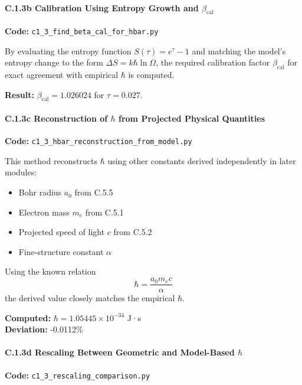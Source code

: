 \documentclass[10.5pt,a4paper]{article}
\begin{document}
\paragraph{C.1.3b Calibration Using Entropy Growth and \(\beta_{\text{cal}}\)}

\noindent\textbf{Code:} \texttt{c1\_3\_find\_beta\_cal\_for\_hbar.py}

By evaluating the entropy function \( S(\tau) = e^\tau - 1 \) and matching the model’s entropy change to the form \( \Delta S = k \hbar \ln \Omega \), the required calibration factor \( \beta_{\text{cal}} \) for exact agreement with empirical \( \hbar \) is computed.

\medskip

\noindent\textbf{Result:} \( \beta_{\text{cal}} = 1.026024 \) for \( \tau = 0.027 \).

\paragraph{C.1.3c Reconstruction of \(\hbar\) from Projected Physical Quantities}

\noindent\textbf{Code:} \texttt{c1\_3\_hbar\_reconstruction\_from\_model.py}

This method reconstructs \( \hbar \) using other constants derived independently in later modules:

\begin{itemize}
    \item Bohr radius \( a_0 \) from C.5.5
    \item Electron mass \( m_e \) from C.5.1
    \item Projected speed of light \( c \) from C.5.2
    \item Fine-structure constant \( \alpha \)
\end{itemize}

Using the known relation 
\[
\hbar = \frac{a_0 m_e c}{\alpha}
\]
the derived value closely matches the empirical \( \hbar \).

\medskip

\noindent\textbf{Computed:} \( \hbar = 1.05445 \times 10^{-34} \) J·s\\
\textbf{Deviation:} -0.0112\%

\paragraph{C.1.3d Rescaling Between Geometric and Model-Based \(\hbar\)}

\noindent\textbf{Code:} \texttt{c1\_3\_rescaling\_comparison.py}
\end{document}
